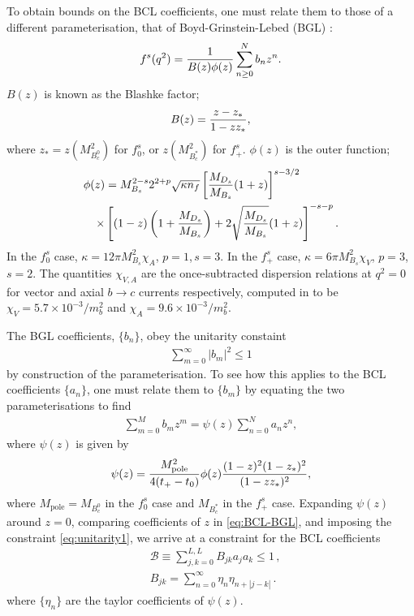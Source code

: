 To obtain bounds on the BCL coefficients, one must relate them to those of a different parameterisation, that of Boyd-Grinstein-Lebed (BGL) \cite{GLENNBOYD1996493}:
\begin{align}
  f^s(q^2) = {1\over B(z)\phi(z)} \sum^N_{n\geq 0} b_n z^n.
\end{align}
$B(z)$ is known as the Blashke factor;
\begin{align}
  B(z) = { z - z_* \over 1 - z z_* },
\end{align}
where $z_* = z(M^2_{B_c^0})$ for $f_0^s$, or $z(M^2_{B_c^*})$ for $f_+^s$. $\phi(z)$ is the outer function;
\begin{align}
  \phi(z) &= M_{B_s}^{2-s} 2^{2+p} \sqrt{\kappa n_f}
  \left[ {M_{D_s}\over M_{B_s}} (1+z)\right]^{s-3/2} \nonumber \\
  \times &\left[ (1-z)\left(1+{M_{D_s}\over M_{B_s}}\right)+2\sqrt{M_{D_s}\over M_{B_s}}(1+z)\right]^{-s-p}.
\end{align}
In the $f^s_0$ case, $\kappa=12\pi M^2_{B_s}\chi_A$, $p=1$,\,$s=3$. In the $f^s_+$ case, $\kappa=6\pi M^2_{B_s} \chi_V$, $p=3$,\,$s=2$. The quantities $\chi_{V,A}$ are the once-subtracted dispersion relations at $q^2=0$ for vector and axial $b\to c$ currents respectively, computed in \cite{GLENNBOYD1996493} to be $\chi_V = 5.7\times 10^{-3}/m_b^2$ and $\chi_A = 9.6\times 10^{-3}/m_b^2$.

The BGL coefficients, $\{ b_n \}$, obey the unitarity constaint
\begin{align}
  \sum_{m=0}^{\infty} |b_m|^2 \leq 1
  \label{eq:unitarity1}
\end{align}
by construction of the parameterisation. To see how this applies to the BCL coefficients $\{ a_n \}$, one must relate them to $\{ b_m \}$ by equating the two parameterisations to find
\begin{align}
  \label{eq:BCL-BGL}
  \sum^M_{m=0} b_m z^m = \psi(z) \sum_{n=0}^N a_n z^n,
\end{align}
where $\psi(z)$ is given by
\begin{align}
  \psi(z) = { M_{\text{pole}}^2 \over 4(t_+ - t_0) } \phi(z) {(1-z)^2(1-z_*)^2\over (1-zz_*)^2 },
\end{align}
where $M_{\text{pole}}=M_{B_c^0}$ in the $f^s_0$ case and $M_{B_c^*}$ in the $f^s_+$ case. Expanding $\psi(z)$ around $z=0$, comparing coefficients of $z$ in \eqref{eq:BCL-BGL}, and imposing the constraint \eqref{eq:unitarity1}, we arrive at a constraint for the BCL coefficients
\begin{align}
    \label{eq:unitarity2}
    &\mathcal{B} \equiv \sum_{j,k=0}^{L,L} B_{jk} a_j a_k \leq 1\,, \\
    &B_{jk} = \sum_{n=0}^{\infty} \eta_n \eta_{n+|j-k|}\,.
        \label{eq:Bmatrix}
\end{align}
where $\{\eta_n\}$ are the taylor coefficients of $\psi(z)$.

